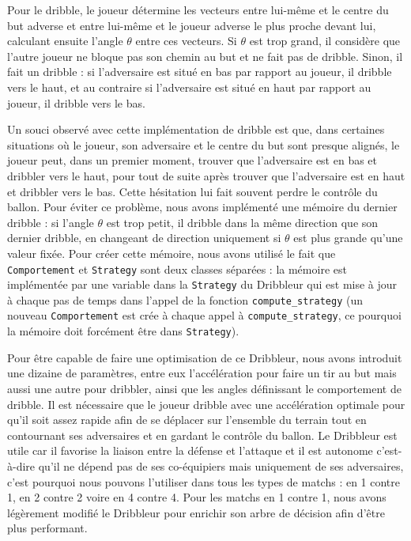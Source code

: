 \documentclass[a4paper,12pt]{article}
\begin{document}
Pour le dribble, le joueur détermine les vecteurs entre lui-même et le centre du but adverse et entre lui-même et le joueur adverse le plus proche devant lui, calculant ensuite l'angle $\theta$ entre ces vecteurs. Si $\theta$ est trop grand, il considère que l'autre joueur ne bloque pas son chemin au but et ne fait pas de dribble. Sinon, il fait un dribble : si l’adversaire est situé en bas par rapport au joueur, il dribble vers le haut, et au contraire si l’adversaire est situé en haut par rapport au joueur, il dribble vers le bas.
 
Un souci observé avec cette implémentation de dribble est que, dans certaines \mbox{situations} où le joueur, son adversaire et le centre du but sont presque alignés, le joueur peut, dans un premier moment, trouver que l'adversaire est en bas et dribbler vers le haut, pour tout de suite après trouver que l'adversaire est en haut et dribbler vers le bas. Cette hésitation lui fait souvent perdre le contrôle du ballon. Pour éviter ce problème, nous avons implémenté une mémoire du dernier dribble : si l'angle $\theta$ est trop petit, il dribble dans la même direction que son dernier dribble, en changeant de direction uniquement si $\theta$ est plus grande qu'une valeur fixée. Pour créer cette mémoire, nous avons utilisé le fait que \texttt{Comportement} et \texttt{Strategy} sont deux classes séparées : la mémoire est implémentée par une variable dans la \texttt{Strategy} du Dribbleur qui est mise à jour à chaque pas de temps dans l'appel de la fonction \texttt{compute\_strategy} (un nouveau \texttt{Comportement} est crée à chaque appel à \texttt{compute\_strategy}, ce pourquoi la mémoire doit forcément être dans \texttt{Strategy}).

Pour être capable de faire une optimisation de ce Dribbleur, nous avons introduit une dizaine de paramètres, entre eux l’accélération pour faire un tir au but mais aussi une autre pour dribbler, ainsi que les angles définissant le comportement de dribble. Il est nécessaire que le joueur dribble avec une accélération optimale pour qu’il soit assez rapide afin de se déplacer sur l’ensemble du terrain tout en contournant ses adversaires et en gardant le contrôle du ballon. Le Dribbleur est utile car il favorise la liaison entre la défense et l'attaque et il est autonome c’est-à-dire qu’il ne dépend pas de ses co-équipiers mais uniquement de ses adversaires, c’est pourquoi nous pouvons l’utiliser dans tous les types de matchs : en 1 contre 1, en 2 contre 2 voire en 4 contre 4. Pour les matchs en 1 contre 1, nous avons légèrement modifié le Dribbleur pour enrichir son arbre de décision afin d'être plus performant.
\end{document}

